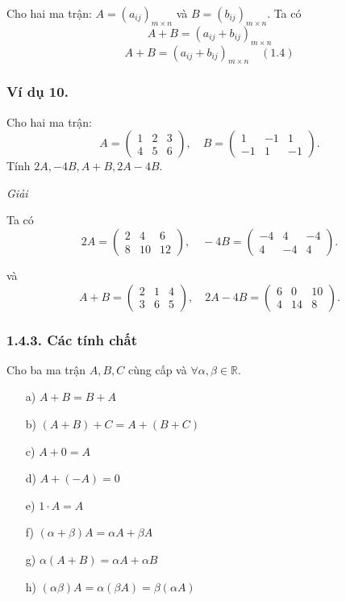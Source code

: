 Cho hai ma trận: \( A = (a_{ij})_{m \times n} \) và \( B = (b_{ij})_{m \times n} \). Ta có
\[
A + B = (a_{ij} + b_{ij})_{m \times n}
\]
\[
A + B = (a_{ij} + b_{ij})_{m \times n} \quad (1.4)
\]
\subsubsection*{Ví dụ 10.}
Cho hai ma trận:
\[
A = \begin{pmatrix}
1 & 2 & 3 \\
4 & 5 & 6
\end{pmatrix}
, \quad
B = \begin{pmatrix}
1 & -1 & 1 \\
-1 & 1 & -1
\end{pmatrix}
.
\]
Tính \( 2A, -4B, A + B, 2A - 4B \).

\textit{Giải}

Ta có
\[
2A = \begin{pmatrix}
2 & 4 & 6 \\
8 & 10 & 12
\end{pmatrix}
, \quad
-4B = \begin{pmatrix}
-4 & 4 & -4 \\
4 & -4 & 4
\end{pmatrix}
.
\]

và
\[
A + B = \begin{pmatrix}
2 & 1 & 4 \\
3 & 6 & 5
\end{pmatrix}
, \quad
2A - 4B = \begin{pmatrix}
6 & 0 & 10 \\
4 & 14 & 8
\end{pmatrix}
.
\]

\subsubsection*{1.4.3. Các tính chất}
Cho ba ma trận \( A, B, C \) cùng cấp và \( \forall \alpha, \beta \in \mathbb{R} \).
\begin{itemize}
    \item[a)] \( A + B = B + A \)
    \item[b)] \( (A + B) + C = A + (B + C) \)
    \item[c)] \( A + 0 = A \)
    \item[d)] \( A + (-A) = 0 \)
    \item[e)] \( 1 \cdot A = A \)
    \item[f)] \( (\alpha + \beta)A = \alpha A + \beta A \)
    \item[g)] \( \alpha(A + B) = \alpha A + \alpha B \)
    \item[h)] \( (\alpha \beta)A = \alpha(\beta A) = \beta(\alpha A) \)
\end{itemize}

